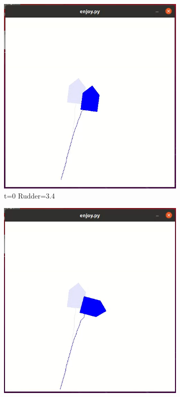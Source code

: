 \documentclass[12pt,twoside]{report}
\begin{document}
\begin{figure}[h]
     \centering
     \begin{subfigure}[b]{0.24\textwidth}
         \centering
         \includegraphics[width=\textwidth]{figures/heading-problem/heading-t0.png}
         \caption{t=0 Rudder=3.4}
     \end{subfigure}
     \begin{subfigure}[b]{0.24\textwidth}
         \centering
         \includegraphics[width=\textwidth]{figures/heading-problem/heading-t1.png}

\end{subfigure}
\end{figure}
\end{document}
